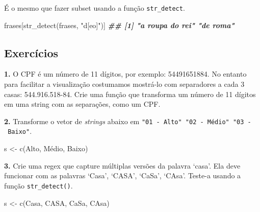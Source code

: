 \documentclass[
]{book}
\newenvironment{Shaded}{\begin{snugshade}}{\end{snugshade}}
\newcommand{\DocumentationTok}[1]{\textcolor[rgb]{0.56,0.35,0.01}{\textbf{\textit{#1}}}}
\newcommand{\FunctionTok}[1]{\textcolor[rgb]{0.00,0.00,0.00}{#1}}
\newcommand{\NormalTok}[1]{#1}
\newcommand{\OtherTok}[1]{\textcolor[rgb]{0.56,0.35,0.01}{#1}}
\newcommand{\StringTok}[1]{\textcolor[rgb]{0.31,0.60,0.02}{#1}}
\begin{document}
É o mesmo que fazer subset usando a função \texttt{str\_detect}.

\begin{Shaded}
\begin{Highlighting}[]
\NormalTok{frases[}\FunctionTok{str\_detect}\NormalTok{(frases, }\StringTok{"d[eo]"}\NormalTok{)]}
\DocumentationTok{\#\# [1] "a roupa do rei" "de roma"}
\end{Highlighting}
\end{Shaded}

\hypertarget{exercuxedcios-19}{%
\subsection{Exercícios}\label{exercuxedcios-19}}

\textbf{1.} O CPF é um número de 11 dígitos, por exemplo: 54491651884. No entanto para facilitar a visualização costumamos mostrá-lo com separadores a cada 3 casas: 544.916.518-84. Crie uma função que transforma um número de 11 dígitos em uma string com as separações, como um CPF.

\textbf{2.} Transforme o vetor de \emph{strings} abaixo em \texttt{"01\ -\ Alto"\ "02\ -\ Médio"\ "03\ -\ Baixo"}.

\begin{Shaded}
\begin{Highlighting}[]
\NormalTok{s }\OtherTok{\textless{}{-}} \FunctionTok{c}\NormalTok{(}\StringTok{\textquotesingle{}Alto\textquotesingle{}}\NormalTok{, }\StringTok{\textquotesingle{}Médio\textquotesingle{}}\NormalTok{, }\StringTok{\textquotesingle{}Baixo\textquotesingle{}}\NormalTok{)}
\end{Highlighting}
\end{Shaded}

\textbf{3.} Crie uma regex que capture múltiplas versões da palavra `casa'. Ela deve funcionar com as palavras `Casa', `CASA', `CaSa', `CAsa'. Teste-a usando a função \texttt{str\_detect()}.

\begin{Shaded}
\begin{Highlighting}[]
\NormalTok{s }\OtherTok{\textless{}{-}} \FunctionTok{c}\NormalTok{(}\StringTok{\textquotesingle{}Casa\textquotesingle{}}\NormalTok{, }\StringTok{\textquotesingle{}CASA\textquotesingle{}}\NormalTok{, }\StringTok{\textquotesingle{}CaSa\textquotesingle{}}\NormalTok{, }\StringTok{\textquotesingle{}CAsa\textquotesingle{}}\NormalTok{)}
\end{Highlighting}
\end{Shaded}
\end{document}
